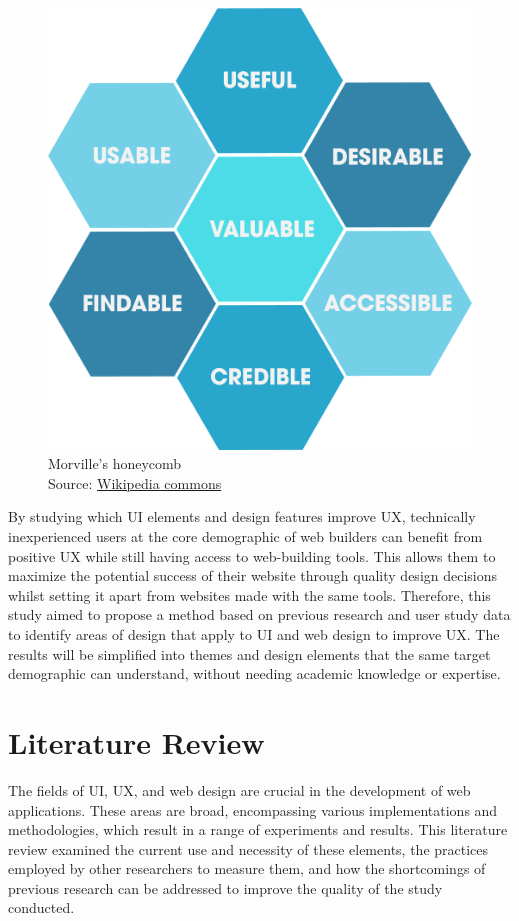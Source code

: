 \documentclass[article]{IEEEtran}
\begin{document}
       \begin{figure}[h]
            \caption{Morville's honeycomb \\\hspace{\textwidth} Source: \href{https://commons.wikimedia.org/wiki/File:UX_Honeycomb.png}{Wikipedia commons}}
            \includegraphics[width=\columnwidth]{images/morvilles-honeycomb.png}
        \end{figure}
                           
        By studying which UI elements and design features improve UX, technically inexperienced users at the core demographic of web builders can benefit from positive UX while still having access to web-building tools. This allows them to maximize the potential success of their website through quality design decisions whilst setting it apart from websites made with the same tools. Therefore, this study aimed to propose a method based on previous research and user study data to identify areas of design that apply to UI and web design to improve UX. The results will be simplified into themes and design elements that the same target demographic can understand, without needing academic knowledge or expertise.

    \section{Literature Review}
        The fields of UI, UX, and web design are crucial in the development of web applications. These areas are broad, encompassing various implementations and methodologies, which result in a range of experiments and results. This literature review examined the current use and necessity of these elements, the practices employed by other researchers to measure them, and how the shortcomings of previous research can be addressed to improve the quality of the study conducted.
        
\end{document}
